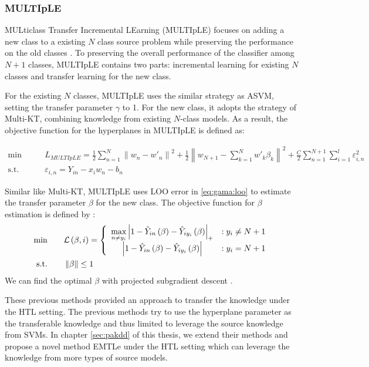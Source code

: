 \subsubsection{MULTIpLE}

MULticlass Transfer Incremental LEarning (MULTIpLE) focuses on adding a new class to a existing $N$ class source problem while preserving the performance on the old classes \cite{kuzborskij2013n}. To preserving the overall performance of the classifier among $N+1$ classes, MULTIpLE contains two parts: incremental learning for existing $N$ classes and transfer learning for the new class.

For the existing $N$ classes, MULTIpLE uses the similar strategy as ASVM, setting the transfer parameter $\gamma$ to 1. For the new class, it adopts the strategy of Multi-KT, combining knowledge from existing $N$-class models. As a result, the objective function for the hyperplanes in MULTIpLE is defined as:

\begin{equation}
\begin{aligned}
\text{min}\qquad {} & L_{MULTIpLE}=\frac{1}{2}\sum\limits_{n = 1}^N {{{\left\| {{w_n} - {{w'}_n}} \right\|}^2}}  + \frac{1}{2}{\left\| {{w_{N + 1}} - \sum\limits_{k = 1}^N {w{'_k}{\beta _k}} } \right\|^2}+ \frac{C}{2}\sum\limits_{n = 1}^{N + 1} {\sum\limits_{i = 1}^l {\varepsilon _{i,n}^2} }  \\
\text{s.t.}\qquad {} &{\varepsilon _{i,n}} = {Y_{in}} -  {x_i}{w_n} - {b_n}
\end{aligned}\label{eq:gama:multiple}
\end{equation}

Similar like Multi-KT, MULTIpLE uses LOO error in \eqref{eq:gama:loo} to estimate the transfer parameter $\beta$ for the new class. The objective function for $\beta$ estimation is defined by \cite{crammer2002algorithmic}:
\begin{equation}\label{eq:gama:multib}
\begin{aligned}
\text{min} \qquad& {\cal L}\left( {\beta ,i} \right) = \left\{ {\begin{array}{*{20}{c}}
{\mathop {\max }\limits_{n \ne {y_i}} {{\left| {1 - {{\hat Y}_{in}}\left( \beta  \right) - {{\hat Y}_{i{y_i}}}\left( \beta  \right)} \right|}_ + }}&{{:y_i} \ne N + 1}\\
{\left| {1 - {{\hat Y}_{in}}\left( \beta  \right) - {{\hat Y}_{i{y_i}}}\left( \beta  \right)} \right|}&{{:y_i} = N + 1}
\end{array}} \right.  \\
\text{s.t.} \qquad& \left\| \beta  \right\| \le 1
\end{aligned}
\end{equation}
We can find the optimal $\beta$ with projected subgradient descent \cite{BoydCO}. 

These previous methods provided an approach to transfer the knowledge under the HTL setting. The previous methods try to use the hyperplane parameter as the transferable knowledge and thus limited to leverage the source knowledge from SVMs. In chapter \ref{sec:pakdd} of this thesis, we extend their methods and propose a novel method EMTLe under the HTL setting which can leverage the knowledge from more types of source models. 